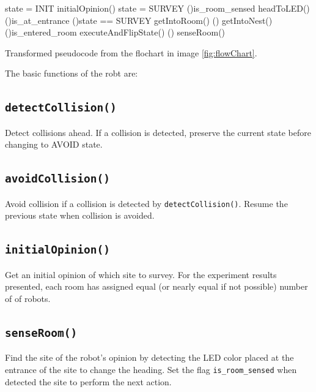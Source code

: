 \documentclass{llncs}
\begin{document}
	\begin{algorithm}[h!]
		state = INIT
		initialOpinion()
		state = SURVEY
		\uIf(){is\_room\_sensed}{
			headToLED()
		}
		\uElseIf(){is\_at\_entrance}{
			\uIf(){state == SURVEY}{
				getIntoRoom()
			}
			\Else(){
				getIntoNest()
			}
		}
		\uElseIf(){is\_entered\_room}{
			executeAndFlipState()
		}
		\Else(){
			senseRoom()
		}
	\caption{Transformed pseudocode from the flochart in image \ref{fig:flowChart}.}\label{alg:pseudocode}
	\end{algorithm}
	
	
	The basic functions of the robt are:
	\subsection*{\texttt{detectCollision()}}
	Detect collisions ahead. If a collision is detected, preserve the current state before changing to AVOID state.
	
	\subsection*{\texttt{avoidCollision()}}
	Avoid collision if a collision is detected by \texttt{detectCollision()}. Resume the previous state when collision is avoided.
	
	\subsection*{\texttt{initialOpinion()}}
	Get an initial opinion of which site to survey. For the experiment results presented, each room has assigned equal (or nearly equal if not possible) number of of robots. 
	\subsection*{\texttt{senseRoom()}}
	Find the site of the robot's opinion by detecting the LED color placed at the entrance of the site to change the heading. Set the flag \texttt{is\_room\_sensed} when detected the site to perform the next action.
	
\end{document}
